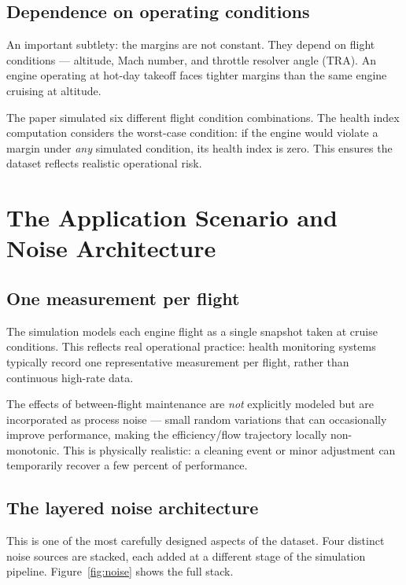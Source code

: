 \documentclass[11pt, a4paper]{article}
\begin{document}
\subsection{Dependence on operating conditions}

An important subtlety: the margins are not constant. They depend on
flight conditions --- altitude, Mach number, and throttle resolver
angle (TRA). An engine operating at hot-day takeoff faces tighter
margins than the same engine cruising at altitude.

The paper simulated six different flight condition combinations.
The health index computation considers the worst-case condition:
if the engine would violate a margin under \emph{any} simulated
condition, its health index is zero. This ensures the dataset
reflects realistic operational risk.

\section{The Application Scenario and Noise Architecture}

\subsection{One measurement per flight}

The simulation models each engine flight as a single snapshot taken
at cruise conditions. This reflects real operational practice: health
monitoring systems typically record one representative measurement
per flight, rather than continuous high-rate data.

The effects of between-flight maintenance are \emph{not} explicitly
modeled but are incorporated as process noise --- small random
variations that can occasionally improve performance, making
the efficiency/flow trajectory locally non-monotonic. This is
physically realistic: a cleaning event or minor adjustment can
temporarily recover a few percent of performance.

\subsection{The layered noise architecture}

This is one of the most carefully designed aspects of the dataset.
Four distinct noise sources are stacked, each added at a different
stage of the simulation pipeline. Figure~\ref{fig:noise} shows
the full stack.
\end{document}
